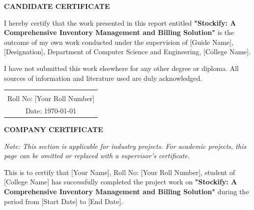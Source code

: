 \thispagestyle{empty}

\begin{center}
{\fontsize{16}{19.2}\selectfont\bfseries CANDIDATE CERTIFICATE}
\end{center}

\vspace{1cm}

I hereby certify that the work presented in this report entitled \textbf{"Stockify: A Comprehensive Inventory Management and Billing Solution"} is the outcome of my own work conducted under the supervision of [Guide Name], [Designation], Department of Computer Science and Engineering, [College Name].

\vspace{0.5cm}

I have not submitted this work elsewhere for any other degree or diploma. All sources of information and literature used are duly acknowledged.

\vspace{2cm}

\begin{flushright}
\begin{tabular}{c}
\\[2cm]
\hline
[Your Name] \\
Roll No: [Your Roll Number] \\
Date: \today
\end{tabular}
\end{flushright}

\newpage
\thispagestyle{empty}

\begin{center}
{\fontsize{16}{19.2}\selectfont\bfseries COMPANY CERTIFICATE}
\end{center}

\vspace{1cm}

\textit{Note: This section is applicable for industry projects. For academic projects, this page can be omitted or replaced with a supervisor's certificate.}

\vspace{2cm}

This is to certify that [Your Name], Roll No: [Your Roll Number], student of [College Name] has successfully completed the project work on \textbf{"Stockify: A Comprehensive Inventory Management and Billing Solution"} during the period from [Start Date] to [End Date].

